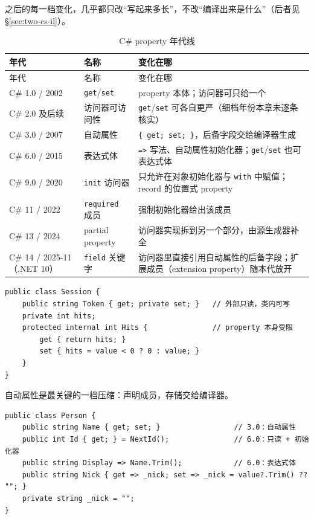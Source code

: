 \documentclass[12pt,a4paper,fontset=fandol]{ctexbook}
\newcommand{\csharplabel}{%
  \tcbox[on line,colback=csharpheadbg,colframe=csharpheadbg,
    boxrule=0pt,arc=1pt,left=2pt,right=2pt,top=1pt,bottom=1pt,
    colupper=white,fontupper=\scriptsize\bfseries]{C\#}}
\begin{document}
之后的每一档变化，几乎都只改“写起来多长”，不改“编译出来是什么”（后者见 \S\ref{sec:two-cs-il}）。

{\footnotesize
\begin{longtable}{@{}>{\raggedright\arraybackslash}p{}>{\raggedright\arraybackslash}p{}>{\raggedright\arraybackslash}p{}@{}}
\caption{C\# property 年代线}\label{tab:ch2-cs-line}\\
\toprule
年代 & 名称 & 变化在哪 \\ \midrule
\endfirsthead
\toprule
年代 & 名称 & 变化在哪 \\ \midrule
\endhead
\bottomrule
\endfoot
C\# 1.0 / 2002 & \texttt{get}/\texttt{set} & property 本体；访问器可只给一个 \\
C\# 2.0 及后续 & 访问器可访问性 & \texttt{get}/\texttt{set} 可各自更严（细档年份本章未逐条核实） \\
C\# 3.0 / 2007 & 自动属性 & \texttt{\{ get; set; \}}，后备字段交给编译器生成 \\
C\# 6.0 / 2015 & 表达式体 & \texttt{=>} 写法、自动属性初始化器；\texttt{get}/\texttt{set} 也可表达式体 \\
C\# 9.0 / 2020 & \texttt{init} 访问器 & 只允许在对象初始化器与 \texttt{with} 中赋值；record 的位置式 property \\
C\# 11 / 2022 & \texttt{required} 成员 & 强制初始化器给出该成员 \\
C\# 13 / 2024 & partial property & 访问器实现拆到另一个部分，由源生成器补全 \\
C\# 14 / 2025-11（.NET 10） & \texttt{field} 关键字 & 访问器里直接引用自动属性的后备字段；扩展成员（extension property）随本代放开 \\
\end{longtable}}

\csharplabel{}
\begin{lstlisting}[style=csharpstyle, caption={C\# 2.0 形态：读写可见性分离}, label={lst:ch2-cs-access}]
public class Session {
    public string Token { get; private set; }   // 外部只读，类内可写
    private int hits;
    protected internal int Hits {               // property 本身受限
        get { return hits; }
        set { hits = value < 0 ? 0 : value; }
    }
}
\end{lstlisting}

自动属性是最关键的一档压缩：声明成员，存储交给编译器。

\csharplabel{}
\begin{lstlisting}[style=csharpstyle, caption={C\# 3.0 自动属性与 C\# 6.0 的写法压缩}, label={lst:ch2-cs-30}]
public class Person {
    public string Name { get; set; }                 // 3.0：自动属性
    public int Id { get; } = NextId();               // 6.0：只读 + 初始化器
    public string Display => Name.Trim();            // 6.0：表达式体
    public string Nick { get => _nick; set => _nick = value?.Trim() ?? ""; }
    private string _nick = "";
}
\end{lstlisting}
\end{document}
